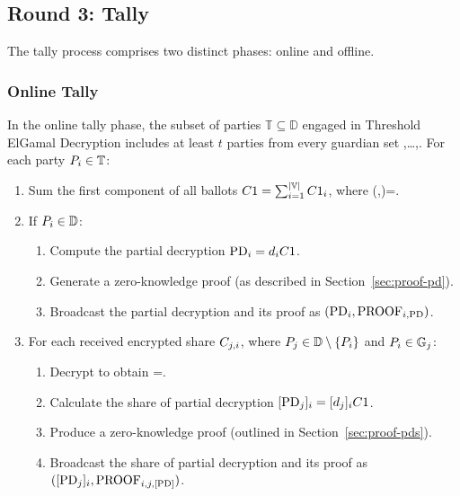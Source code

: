 \documentclass[runningheads]{llncs}
\begin{document}
\subsection{Round 3: Tally}

The tally process comprises two distinct phases: online and offline.

\subsubsection{Online Tally}

In the online tally phase, the subset of parties $\mathbb{T} \subseteq  \mathbb{D}$ engaged in Threshold ElGamal Decryption includes at least $t$ parties from every guardian set ,\dots,. For each party $P_{i} \in \mathbb{T}$:

\begin{enumerate}
    \item Sum the first component of all ballots $C1 = \sum_{i=1}^{|\mathbb{V}|} C1_{i}$, where (,)=.

    \item If $P_{i} \in \mathbb{D}$:
        \begin{enumerate}
            \item Compute the partial decryption $\mathrm{PD}_{i} = d_{i} C1$.
            \item Generate a zero-knowledge proof  (as described in Section~\ref{sec:proof-pd}).
            \item Broadcast the partial decryption and its proof as $(\mathrm{PD}_{i}, \textrm{PROOF}_{i,\textrm{PD}})$.
        \end{enumerate}
    
    \item For each received encrypted share $C_{j,i}$, where $P_{j} \in \mathbb{D} \setminus \{P_{i}\}$ and $P_{i} \in \mathbb{G}_{j}$:
        \begin{enumerate}
            \item Decrypt to obtain =.
            \item Calculate the share of partial decryption $[\mathrm{PD}_{j}]_{i} = [d_{j}]_{i} C1$.
            \item Produce a zero-knowledge proof  (outlined in Section~\ref{sec:proof-pds}).
            \item Broadcast the share of partial decryption and its proof as $([\mathrm{PD}_{j}]_{i}, \textrm{PROOF}_{i,j,\textrm{[PD]}})$.
        \end{enumerate}
\end{enumerate}
\end{document}
